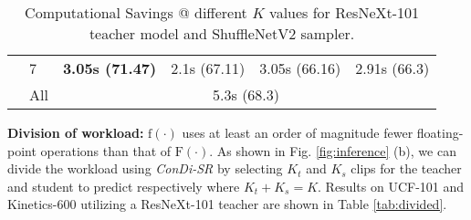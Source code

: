 \documentclass[a4paper,conference]{IEEEtran}
\begin{document}
\begin{table}[h]
\begin{center}
{{\begin{tabular}{ll|cccc}
\multicolumn{1}{l|}{}             & 7     & \multicolumn{1}{c|}{\textbf{3.05s (71.47)}} & \multicolumn{1}{l|}{2.1s (67.11)}  & \multicolumn{1}{c|}{3.05s (66.16)} & 2.91s (66.3)                \\ \cline{2-6} 
\multicolumn{1}{l|}{}             & All & \multicolumn{4}{c}{5.3s (68.3)} \\                        \bottomrule
\end{tabular}
}}
\caption{Computational Savings @ different $K$ values for ResNeXt-101 teacher model and ShuffleNetV2 sampler.}
\label{tab:speed}
\end{center}
\vspace{-15pt}
\end{table}

{\bf Division of workload:} $\mathrm{f}(\cdot)$ uses at least an order of magnitude fewer floating-point operations than that of $\mathrm{F}(\cdot)$. As shown in Fig. \ref{fig:inference} (b), we can divide the workload using \textit{ConDi-SR} by selecting $K_t$ and $K_s$ clips for the teacher and student to predict respectively where $K_t + K_s = K$. Results on UCF-101 and Kinetics-600 utilizing a ResNeXt-101 teacher are shown in Table \ref{tab:divided}.

\begin{table}[h]
\begin{center}
{}
\vspace{2mm}
\caption{Dividing the workload between the teacher and student at different $K_s$ values for the ResNeXt-101 teacher model and the ShuffleNetV2 student sampler; This approach will be more useful when a video has more clips (i.e. $K$ is large).}
\label{tab:divided}
\end{center}
\vspace{-5mm}
\end{table}
\end{document}
